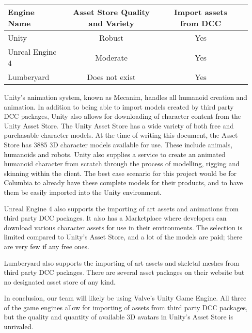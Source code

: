 \documentclass[10pt,journal,compsoc,onecolumn, draftclsnofoot]{IEEEtran}
\begin{document}
\vspace{2mm}
\begin{table}[h!]
\centering
  \begin{tabular}{ | l || c | c | c | }
  \hline
  Engine Name & Asset Store Quality and Variety & Import assets from DCC\\
  \hline
  Unity & Robust & Yes\\ \hline
  Unreal Engine 4 & Moderate &  Yes\\ \hline
  Lumberyard & Does not exist & Yes\\ \hline
  \end{tabular}
\end{table}
\vspace{2mm}

Unity's animation system, known as Mecanim, handles all humanoid creation and animation. In addition to being able to import models created by third party DCC packages, Unity also allows for downloading of character content from the Unity Asset Store. The Unity Asset Store has a wide variety of both free and purchasable character models. At the time of writing this document, the Asset Store has 3885 3D character models available for use. These include animals, humanoids and robots. Unity also supplies a service to create an animated humanoid character from scratch through the process of modelling, rigging and skinning within the client. The best case scenario for this project would be for Columbia to already have these complete models for their products, and to have them be easily imported into the Unity environment.

Unreal Engine 4 also supports the importing of art assets and animations from third party DCC packages\cite{unreal_character}. It also has a Marketplace where developers can download various character assets for use in their environments. The selection is limited compared to Unity's Asset Store, and a lot of the models are paid; there are very few if any free ones.

Lumberyard also supports the importing of art assets and skeletal meshes from third party DCC packages\cite{lumberyard_character}. There are several asset packages on their website but no designated asset store of any kind.

In conclusion, our team will likely be using Valve's Unity Game Engine. All three of the game engines allow for importing of assets from third party DCC packages, but the quality and quantity of available 3D avatars in Unity's Asset Store is unrivaled.
\end{document}
